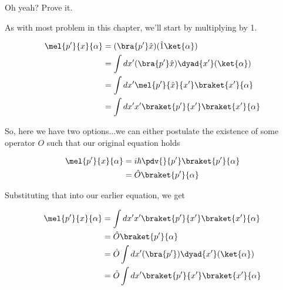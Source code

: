 \begin{answer}
  \begin{answerpart}{Oh yeah?  Prove it.}

    \begin{answerspart}

      As with most problem in this chapter, we'll start by multiplying
      by 1.

      \begin{equation}
        \begin{split}
          \mel{p'}{x}{\alpha}
          &=(\bra{p'}\hat{x})(\hat{1}\ket{\alpha})\\
          &=\int dx' (\bra{p'}\hat{x})\dyad{x'}(\ket{\alpha})\\
          &=\int dx' \mel{p'}{\hat{x}}{x'}\braket{x'}{\alpha}\\
          &=\int dx' x'\braket{p'}{x'}\braket{x'}{\alpha}\\
        \end{split}
      \end{equation}

      So, here we have two options...we can either postulate the
      existence of some operator $O$ such that our original equation
      holds

      \begin{equation}
        \begin{split}
          \mel{p'}{x}{\alpha}
          &= i\hbar \pdv{}{p'}\braket{p'}{\alpha}\\
          &= \hat{O}\braket{p'}{\alpha}\\
        \end{split}
      \end{equation}

      Substituting that into our earlier equation, we get

      \begin{equation}
        \begin{split}
          \mel{p'}{x}{\alpha}
          &=\int dx' x'\braket{p'}{x'}\braket{x'}{\alpha}\\
          &=\hat{O}\braket{p'}{\alpha}\\
          &=\hat{O}\int dx' (\bra{p'}) \dyad{x'} (\ket{\alpha})\\
          &=\hat{O}\int dx' \braket{p'}{x'}\braket{x'}{\alpha}\\
        \end{split}
      \end{equation}


\end{answerspart}
\end{answerpart}
\end{answer}
